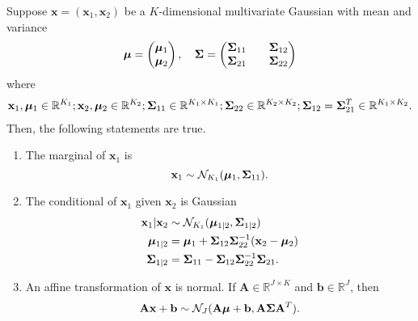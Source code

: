 \begin{theorem}\label{thm:ogag}
    Suppose $\mathbf{x} = (\mathbf{x}_1, \mathbf{x}_2)$ be a $K$-dimensional multivariate Gaussian with mean and variance
    \begin{equation*}
        \boldsymbol{\mu} =
        \begin{pmatrix}
            \boldsymbol{\mu}_1 \\
            \boldsymbol{\mu}_2
        \end{pmatrix}
        ,\quad
        \boldsymbol{\Sigma} =
        \begin{pmatrix}
            \boldsymbol{\Sigma}_{11} &  & \boldsymbol{\Sigma}_{12} \\
            \boldsymbol{\Sigma}_{21} &  & \boldsymbol{\Sigma}_{22} \\
        \end{pmatrix}
    \end{equation*}
    where
    \begin{align*}
        \mathbf{x}_1, \boldsymbol{\mu}_1 \in \mathbb{R}^{K_1};
        \mathbf{x}_2, \boldsymbol{\mu}_2 \in \mathbb{R}^{K_2};
        \boldsymbol{\Sigma}_{11} \in \mathbb{R}^{K_1 \times K_1};
        \boldsymbol{\Sigma}_{22} \in \mathbb{R}^{K_2 \times K_2};
        \boldsymbol{\Sigma}_{12} = \boldsymbol{\Sigma}_{21}^{T} \in \mathbb{R}^{K_1 \times K_2}.
    \end{align*}
    Then, the following statements are true.
    \begin{enumerate}
        \item
            The marginal of $\mathbf{x}_1$ is
            \begin{equation*}
                \mathbf{x}_{1} \sim \mathcal{N}_{K_1}(\boldsymbol{\mu}_1, \boldsymbol{\Sigma}_{11}).
            \end{equation*}

        \item
            The conditional of $\mathbf{x}_1$ given $\mathbf{x}_2$ is Gaussian
            \begin{align*}
                \mathbf{x}_1 | \mathbf{x}_2 & \sim \mathcal{N}_{K_1}(\boldsymbol{\mu}_{1 | 2}, \boldsymbol{\Sigma}_{1 | 2}) \\
                \boldsymbol{\mu}_{1 | 2} & = \boldsymbol{\mu}_1 + \boldsymbol{\Sigma}_{12} \boldsymbol{\Sigma}_{22}^{-1} (\mathbf{x}_2 - \boldsymbol{\mu}_2) \\
                \boldsymbol{\Sigma}_{1|2 } & = \boldsymbol{\Sigma}_{11} - \boldsymbol{\Sigma}_{12} \boldsymbol{\Sigma}_{22}^{-1} \boldsymbol{\Sigma}_{21}.
            \end{align*}

        \item
            An affine transformation of $\mathbf{x}$ is normal.
            If $\mathbf{A} \in \mathbb{R}^{J \times K}$ and $\mathbf{b} \in \mathbb{R}^{J}$, then
            \begin{equation*}
                \mathbf{Ax} + \mathbf{b} \sim \mathcal{N}_J(
                \mathbf{A} \boldsymbol{\mu} + \mathbf{b},
                \mathbf{A} \boldsymbol{\Sigma} \mathbf{A}^{T}
                ).
            \end{equation*}


\end{enumerate}
\end{theorem}

